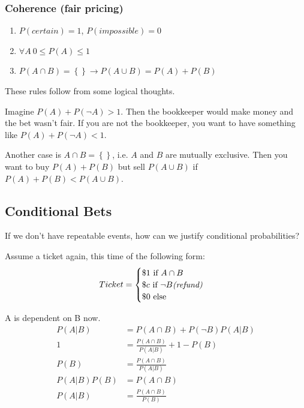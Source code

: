 \subsubsection*{Coherence (fair pricing)}
\begin{enumerate}
	\item $P(certain) = 1$, $P(impossible) = 0$
  \item $\forall A\ 0 \leq P(A) \leq 1$
  \item $P(A \cap B) = \left\{\right\} \rightarrow P(A \cup B) = P(A) + P(B)$
\end{enumerate}

These rules follow from some logical thoughts.

Imagine $P(A) + P(\neg A) > 1$. Then the bookkeeper would make money and the bet wasn't fair. If you are not the bookkeeper, you want to have something like $P(A) + P(\neg A) < 1$.

Another case is $A \cap B = \left\{\right\}$, i.e. $A$ and $B$ are mutually exclusive. Then you want to buy $P(A)+P(B)$ but sell $P(A \cup B)$ if $P(A) + P(B) < P(A \cup B)$.

\subsection{Conditional Bets}
If we don't have repeatable events, how can we justify conditional probabilities?

Assume a ticket again, this time of the following form:
\begin{align*}
Ticket = 
  \begin{cases}
    \$1 \mbox{ if } A \cap B \\
    \$c \mbox{ if } \neg B \mbox{\textit{(refund)}} \\
    \$0 \mbox{ else}
  \end{cases}
\end{align*}

A is dependent on B now.
\begin{align*}
P(A|B)     &=       P(A \cap B)          + P(\neg B) P(A|B) \\
         1 &= \frac{P(A \cap B)}{P(A|B)} + 1 - P(B)         \\
      P(B) &= \frac{P(A \cap B)}{P(A|B)}                    \\
P(A|B)P(B) &=       P(A \cap B)                             \\
P(A|B)     &= \frac{P(A \cap B)}{P(B)}
\end{align*}

